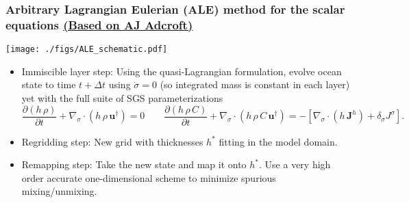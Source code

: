 \documentclass[10pt]{beamer}
\begin{document}
\begin{frame}
  \frametitle{Arbitrary Lagrangian Eulerian (ALE) method for the scalar equations \small  
\href{https://adcroft.github.io/2017/03/01/MOM6-ALE-algorithm.html}{(Based on AJ Adcroft)} }

\vspace{-.3cm} 


\begin{center}
{\texttt{[image: ./figs/ALE\_schematic.pdf]}}
\end{center}


\begin{exampleblock}{}
\begin{itemize}

\item {\sc Immiscible layer step:} Using the quasi-Lagrangian
  formulation, evolve ocean state to time $t + \Delta t$ using
  $\dot{\sigma} = 0$ (so integrated mass is constant in each layer)
  yet with the full suite of SGS parameterizations
\begin{equation*}
\frac{\partial (h \, \rho)}{\partial  t} + \nabla_{\sigma} \cdot (h \, \rho \, {\bm u}^{\dagger} ) = 0 
\qquad 
 \frac{\partial (h \, \rho \, C)}{\partial  t} + \nabla_{\sigma} \cdot (h \, \rho \, C \, {\bm u}^{\dagger} ) 
 =
 -\left[  \nabla_{\sigma} \cdot ( h \, {\bm J}^{h}) +  \delta_{\sigma} J^{\sigma} \right]. 
\label{eq:gvc-mass-tracer-equation-ALE-stepA}
\end{equation*}


\item {\sc Regridding step:} New grid with thicknesses $h^{*}$ fitting
  in the model domain.

\item {\sc Remapping step:} Take the new state and map it onto $h^*$.
  Use a very high order accurate one-dimensional scheme to minimize
  spurious mixing/unmixing.

\end{itemize}
\end{exampleblock}{}

\end{frame}
\end{document}
